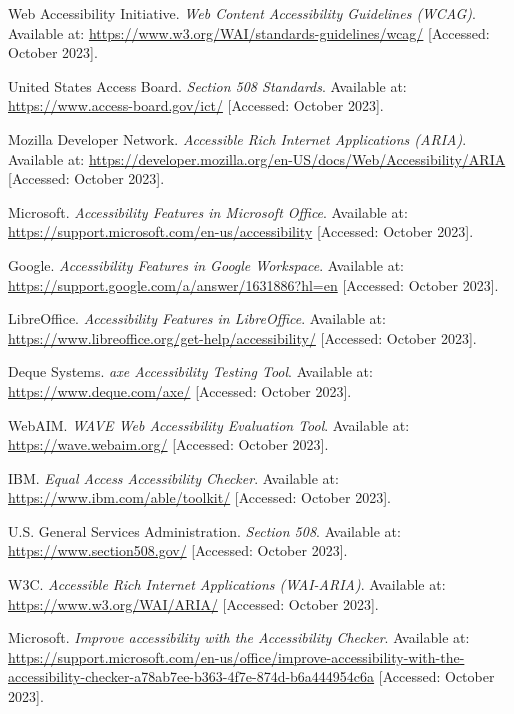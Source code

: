 \begin{thebibliography}{99}

 Web Accessibility Initiative. \textit{Web Content Accessibility Guidelines (WCAG)}. Available at: \url{https://www.w3.org/WAI/standards-guidelines/wcag/} [Accessed: October 2023].

 United States Access Board. \textit{Section 508 Standards}. Available at: \url{https://www.access-board.gov/ict/} [Accessed: October 2023].

 Mozilla Developer Network. \textit{Accessible Rich Internet Applications (ARIA)}. Available at: \url{https://developer.mozilla.org/en-US/docs/Web/Accessibility/ARIA} [Accessed: October 2023].

 Microsoft. \textit{Accessibility Features in Microsoft Office}. Available at: \url{https://support.microsoft.com/en-us/accessibility} [Accessed: October 2023].

 Google. \textit{Accessibility Features in Google Workspace}. Available at: \url{https://support.google.com/a/answer/1631886?hl=en} [Accessed: October 2023].

 LibreOffice. \textit{Accessibility Features in LibreOffice}. Available at: \url{https://www.libreoffice.org/get-help/accessibility/} [Accessed: October 2023].

 Deque Systems. \textit{axe Accessibility Testing Tool}. Available at: \url{https://www.deque.com/axe/} [Accessed: October 2023].

 WebAIM. \textit{WAVE Web Accessibility Evaluation Tool}. Available at: \url{https://wave.webaim.org/} [Accessed: October 2023].

 IBM. \textit{Equal Access Accessibility Checker}. Available at: \url{https://www.ibm.com/able/toolkit/} [Accessed: October 2023].

 U.S. General Services Administration. \textit{Section 508}. Available at: \url{https://www.section508.gov/} [Accessed: October 2023].

 W3C. \textit{Accessible Rich Internet Applications (WAI-ARIA)}. Available at: \url{https://www.w3.org/WAI/ARIA/} [Accessed: October 2023].

 Microsoft. \textit{Improve accessibility with the Accessibility Checker}. Available at: \url{https://support.microsoft.com/en-us/office/improve-accessibility-with-the-accessibility-checker-a78ab7ee-b363-4f7e-874d-b6a444954c6a} [Accessed: October 2023].


\end{thebibliography}
